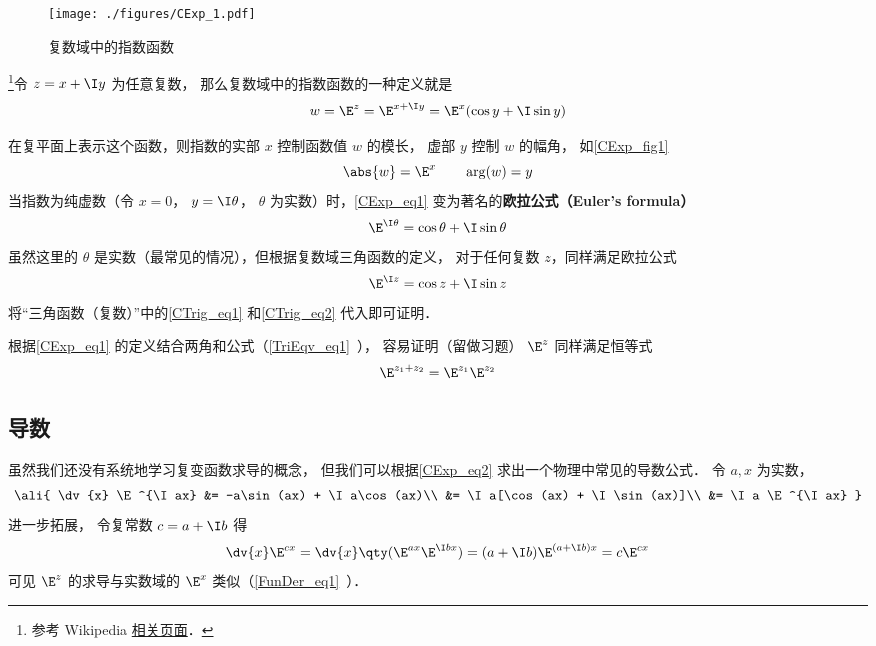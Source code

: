 


\begin{figure}[ht]
\centering
\texttt{[image: ./figures/CExp\_1.pdf]}
\caption{复数域中的指数函数} \label{CExp_fig1}
\end{figure}

\footnote{参考 Wikipedia \href{https://en.wikipedia.org/wiki/Euler's_formula}{相关页面}．}令 $z = x + \I y$ 为任意复数， 那么复数域中的指数函数的一种定义就是
\begin{equation}\label{CExp_eq1}
w = \E^z = \E^{x + \I y} = \E^x(\cos y + \I\sin y)
\end{equation}

在复平面上表示这个函数，则指数的实部 $x$ 控制函数值 $w$ 的模长， 虚部 $y$ 控制 $w$ 的幅角， 如\autoref{CExp_fig1}
 \begin{equation}
\abs{w} = \E^x \qquad \arg(w) = y
\end{equation}
当指数为纯虚数（令 $x = 0$， $y = \I\theta$， $\theta$ 为实数）时，\autoref{CExp_eq1} 变为著名的\textbf{欧拉公式（Euler's formula）}
\begin{equation}\label{CExp_eq2}
\E^{\I \theta} = \cos \theta + \I\sin \theta
\end{equation}
虽然这里的 $\theta$ 是实数（最常见的情况），但根据复数域三角函数的定义， 对于任何复数 $z$，同样满足欧拉公式
\begin{equation}
\E^{\I z} = \cos z + \I\sin z
\end{equation}
将“三角函数（复数）”中的\autoref{CTrig_eq1} 和\autoref{CTrig_eq2} 代入即可证明．

根据\autoref{CExp_eq1} 的定义结合两角和公式（\autoref{TriEqv_eq1}~）， 容易证明（留做习题） $\E^z$ 同样满足恒等式
\begin{equation}
\E^{z_1 + z_2} = \E^{z_1}\E^{z_2}
\end{equation}

\subsection{导数}
虽然我们还没有系统地学习复变函数求导的概念， 但我们可以根据\autoref{CExp_eq2} 求出一个物理中常见的导数公式． 令 $a,x$ 为实数，
\begin{equation}\ali{
\dv{x} \E^{\I ax} &= -a\sin(ax) + \I a\cos(ax)\\
&= \I a[\cos(ax) + \I \sin(ax)]\\
&= \I a \E^{\I ax}
}\end{equation}
进一步拓展， 令复常数 $c = a + \I b$ 得
\begin{equation}
\dv{x}\E^{c x} = \dv{x} \qty(\E^{ax}\E^{\I bx}) = (a + \I b)\E^{(a+\I b)x} = c\E^{cx}
\end{equation}
可见 $\E^z$ 的求导与实数域的 $\E^x$ 类似（\autoref{FunDer_eq1}~）．

